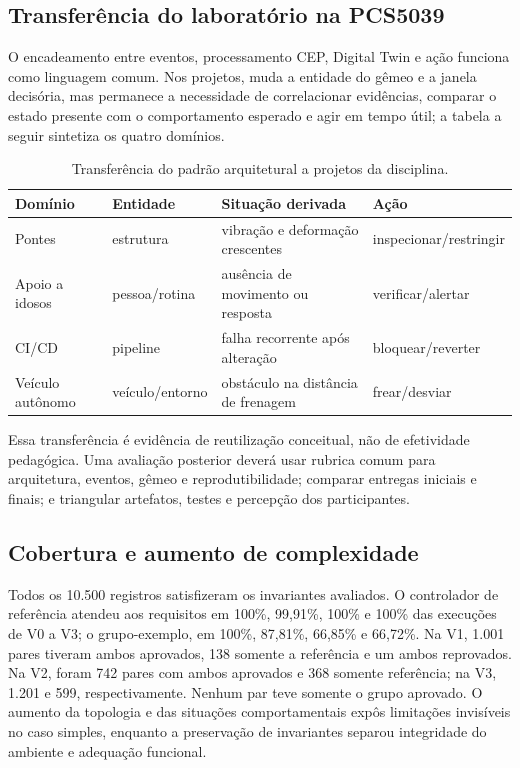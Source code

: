 \documentclass[10pt,a4paper]{article}
\begin{document}
\subsection{Transferência do laboratório na PCS5039}

O encadeamento entre eventos, processamento CEP, Digital Twin e ação funciona como linguagem comum. Nos projetos, muda a entidade do gêmeo e a janela decisória, mas permanece a necessidade de correlacionar evidências, comparar o estado presente com o comportamento esperado e agir em tempo útil; a tabela a seguir sintetiza os quatro domínios.

\begin{table}[ht]
\centering
\caption{Transferência do padrão arquitetural a projetos da disciplina.}
\label{tab:transferencia}
\small
\begin{tabularx}{\linewidth}{p{2.0cm}p{2.3cm}X p{2.1cm}}
\toprule
Domínio & Entidade & Situação derivada & Ação \\
\midrule
Pontes & estrutura & vibração e deformação crescentes & inspecionar/restringir \\
Apoio a idosos & pessoa/rotina & ausência de movimento ou resposta & verificar/alertar \\
CI/CD & pipeline & falha recorrente após alteração & bloquear/reverter \\
Veículo autônomo & veículo/entorno & obstáculo na distância de frenagem & frear/desviar \\
\bottomrule
\end{tabularx}
\end{table}

Essa transferência é evidência de reutilização conceitual, não de efetividade pedagógica. Uma avaliação posterior deverá usar rubrica comum para arquitetura, eventos, gêmeo e reprodutibilidade; comparar entregas iniciais e finais; e triangular artefatos, testes e percepção dos participantes.


\subsection{Cobertura e aumento de complexidade}

Todos os 10.500 registros satisfizeram os invariantes avaliados. O controlador de referência atendeu aos requisitos em 100\%, 99,91\%, 100\% e 100\% das execuções de V0 a V3; o grupo-exemplo, em 100\%, 87,81\%, 66,85\% e 66,72\%. Na V1, 1.001 pares tiveram ambos aprovados, 138 somente a referência e um ambos reprovados. Na V2, foram 742 pares com ambos aprovados e 368 somente referência; na V3, 1.201 e 599, respectivamente. Nenhum par teve somente o grupo aprovado. O aumento da topologia e das situações comportamentais expôs limitações invisíveis no caso simples, enquanto a preservação de invariantes separou integridade do ambiente e adequação funcional.
\end{document}
